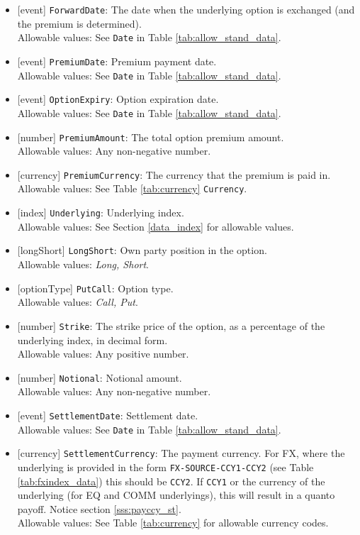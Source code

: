 \begin{itemize}
  \item{}[event] \lstinline!ForwardDate!: The date when the underlying option is exchanged (and the premium is determined). \\
  Allowable values: See \lstinline!Date! in Table \ref{tab:allow_stand_data}.
  \item{}[event] \lstinline!PremiumDate!: Premium payment date. \\
  Allowable values: See \lstinline!Date! in Table \ref{tab:allow_stand_data}.
  \item{}[event] \lstinline!OptionExpiry!: Option expiration date. \\
  Allowable values: See \lstinline!Date! in Table \ref{tab:allow_stand_data}.
  \item{}[number] \lstinline!PremiumAmount!: The total option premium amount. \\
  Allowable values: Any non-negative number.
  \item{}[currency] \lstinline!PremiumCurrency!: The currency that the premium is paid in. \\
  Allowable values: See Table \ref{tab:currency} \lstinline!Currency!.
  \item{}[index] \lstinline!Underlying!: Underlying index. \\
  Allowable values: See Section \ref{data_index} for allowable values.
  \item{}[longShort] \lstinline!LongShort!: Own party position in the option. \\
  Allowable values: \emph{Long, Short}.
  \item{}[optionType] \lstinline!PutCall!: Option type. \\
  Allowable values: \emph{Call, Put}.
  \item{}[number] \lstinline!Strike!: The strike price of the option, as a percentage of the underlying index, in decimal form. \\
  Allowable values: Any positive number.
  \item{}[number] \lstinline!Notional!: Notional amount. \\
  Allowable values: Any non-negative number.
  \item{}[event] \lstinline!SettlementDate!: Settlement date. \\
  Allowable values: See \lstinline!Date! in Table \ref{tab:allow_stand_data}.
  \item{}[currency] \lstinline!SettlementCurrency!: The payment currency. For FX, where the underlying is provided
      in the form \lstinline!FX-SOURCE-CCY1-CCY2! (see Table \ref{tab:fxindex_data}) this should
      be \lstinline!CCY2!. If \lstinline!CCY1! or the currency of the underlying (for EQ and
      COMM underlyings), this will result in a quanto payoff. Notice section \ref{sss:payccy_st}. \\
        Allowable values: See Table \ref{tab:currency} for allowable currency codes.
\end{itemize}

